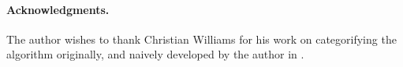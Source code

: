 \paragraph{Acknowledgments.}
The author wishes to thank Christian Williams for his work on
categorifying the algorithm originally, and naively developed
by the author in \cite{DBLP:conf/tgc/MeredithR05}.

